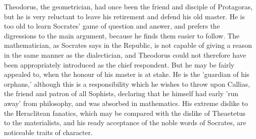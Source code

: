 Theodorus, the geometrician, had once been the friend and disciple of
Protagoras, but he is very reluctant to leave his retirement and defend
his old master. He is too old to learn Socrates' game of question and
answer, and prefers the digressions to the main argument, because he
finds them easier to follow. The mathematician, as Socrates says in the
Republic, is not capable of giving a reason in the same manner as the
dialectician, and Theodorus could not therefore have been appropriately
introduced as the chief respondent. But he may be fairly appealed to,
when the honour of his master is at stake. He is the 'guardian of his
orphans,' although this is a responsibility which he wishes to throw
upon Callias, the friend and patron of all Sophists, declaring that
he himself had early 'run away' from philosophy, and was absorbed in
mathematics. His extreme dislike to the Heraclitean fanatics, which may
be compared with the dislike of Theaetetus to the materialists, and his
ready acceptance of the noble words of Socrates, are noticeable traits
of character.

